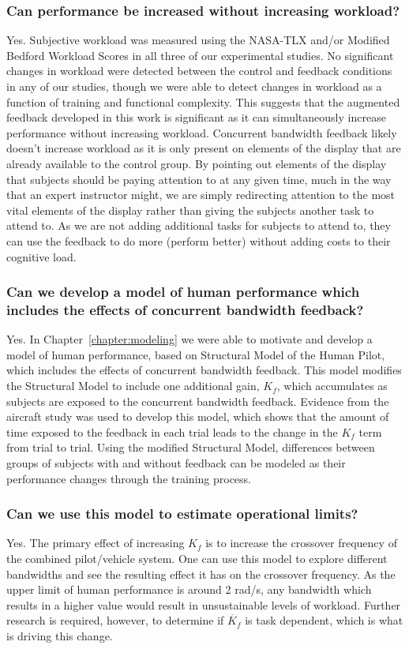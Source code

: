\subsubsection{Can performance be increased without increasing workload?}
Yes.
Subjective workload was measured using the NASA-TLX and/or Modified Bedford Workload Scores in all three of our experimental studies.
No significant changes in workload were detected between the control and feedback conditions in any of our studies, though we were able to detect changes in workload as a function of training and functional complexity.
This suggests that the augmented feedback developed in this work is significant as it can simultaneously increase performance without increasing workload.
Concurrent bandwidth feedback likely doesn't increase workload as it is only present on elements of the display that are already available to the control group.
By pointing out elements of the display that subjects should be paying attention to at any given time, much in the way that an expert instructor might, we are simply redirecting attention to the most vital elements of the display rather than giving the subjects another task to attend to.
As we are not adding additional tasks for subjects to attend to, they can use the feedback to do more (perform better) without adding costs to their cognitive load.

\subsubsection{Can we develop a model of human performance which includes the effects of concurrent bandwidth feedback?}
Yes.
In Chapter~\ref{chapter:modeling} we were able to motivate and develop a model of human performance, based on Structural Model of the Human Pilot, which includes the effects of concurrent bandwidth feedback.
This model modifies the Structural Model to include one additional gain, $K_f$, which accumulates as subjects are exposed to the concurrent bandwidth feedback.
Evidence from the aircraft study was used to develop this model, which shows that the amount of time exposed to the feedback in each trial leads to the change in the $K_f$ term from trial to trial.
Using the modified Structural Model, differences between groups of subjects with and without feedback can be modeled as their performance changes through the training process.

\subsubsection{Can we use this model to estimate operational limits?}
Yes.
The primary effect of increasing $K_f$ is to increase the crossover frequency of the combined pilot/vehicle system.
One can use this model to explore different bandwidths and see the resulting effect it has on the crossover frequency.
As the upper limit of human performance is around 2 rad/s, any bandwidth which results in a higher value would result in unsustainable levels of workload.
Further research is required, however, to determine if $\dot{K_f}$ is task dependent, which is what is driving this change.

